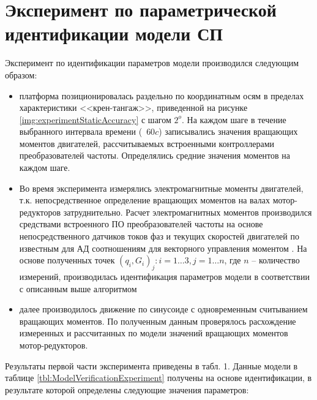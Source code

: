 \section{Эксперимент по параметрической идентификации модели СП} \label{sect6_2}
Эксперимент по идентификации параметров модели производился следующим образом:
\begin{itemize}

\item	платформа позиционировалась раздельно по координатным осям в пределах характеристики <<крен-тангаж>>, приведенной на рисунке \ref{img:experimentStaticAccuracy} с шагом $2^o$. На каждом шаге в течение выбранного интервала времени (~$60 c$) записывались значения вращающих моментов двигателей, рассчитываемых встроенными контроллерами преобразователей частоты. Определялись средние значения моментов на каждом шаге.
\item	Во время эксперимента измерялись электромагнитные моменты двигателей, т.к. непосредственное определение вращающих моментов на валах мотор-редукторов затруднительно. Расчет электромагнитных моментов производился средствами встроенного ПО преобразователей частоты на основе непосредственного датчиков токов фаз и текущих скоростей двигателей по известным для АД соотношениям для векторного управления моментом \cite{2014a,2015b}. На основе полученных точек $(q_i, G_i)_j: i = 1 \ldots 3, j = 1 \ldots n$, где $n$ – количество измерений, производилась идентификация параметров модели в соответствии с описанным выше алгоритмом
\item	далее производилось движение по синусоиде с одновременным считыванием вращающих моментов. По полученным данным проверялось расхождение измеренных и рассчитанных по модели значений вращающих моментов мотор-редукторов.
\end{itemize}
Результаты первой части эксперимента приведены в табл. 1.
Данные модели в таблице \ref{tbl:ModelVerificationExperiment} получены на основе идентификации, в результате которой определены следующие значения параметров:

